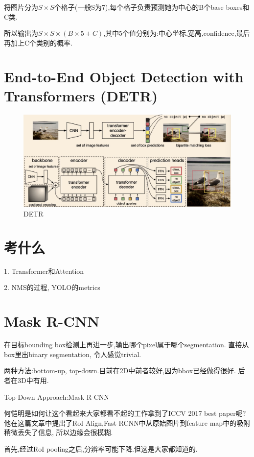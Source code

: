 将图片分为$S\times S$个格子(一般S为7),每个格子负责预测她为中心的B个base boxes和C类.

所以输出为$S\times S\times (B\times 5+C)$,其中5个值分别为:中心坐标,宽高,confidence,最后再加上C个类别的概率.

\section{End-to-End Object Detection with Transformers (DETR)}

\begin{figure}[htbp]
    \centering
    \includegraphics[scale=0.2]{figures/DETR.png}
    \caption{DETR}
    \label{fig:DETR}
\end{figure}

\section{考什么}

1. Transformer和Attention

2. NMS的过程, YOLO的metrics

\section{Mask R-CNN}

在目标bounding box检测上再进一步,输出哪个pixel属于哪个segmentation.
直接从box里出binary segmentation, 令人感觉trivial.

两种方法:bottom-up, top-down.目前在2D中前者较好,因为bbox已经做得很好.
后者在3D中有用.

Top-Down Approach:Mask R-CNN

何恺明是如何让这个看起来大家都看不起的工作拿到了ICCV 2017 best paper呢?
他在这篇文章中提出了RoI Align,Fast RCNN中从原始图片到feature map中的吸附
稍微丢失了信息, 所以边缘会很模糊.

首先,经过RoI pooling之后,分辨率可能下降.但这是大家都知道的.

